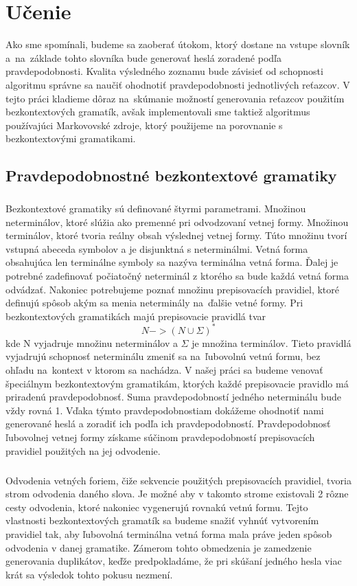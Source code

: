 \chapter{Učenie}
Ako sme spomínali, budeme sa zaoberať útokom, ktorý dostane na vstupe slovník a~na~základe tohto slovníka bude generovať heslá zoradené podľa pravdepodobnosti. Kvalita výsledného zoznamu bude závisieť od schopnosti algoritmu správne sa naučiť ohodnotiť pravdepodobnosti jednotlivých reťazcov. V tejto práci kladieme dôraz na~skúmanie možností generovania reťazcov použitím bezkontextových gramatík, avšak implementovali sme taktiež algoritmus používajúci Markovovské zdroje, ktorý použijeme na porovnanie s bezkontextovými gramatikami.

\section{Pravdepodobnostné bezkontextové gramatiky}
\paragraph{}
Bezkontextové gramatiky sú definované štyrmi parametrami. Množinou neterminálov, ktoré slúžia ako premenné pri odvodzovaní vetnej formy. Množinou terminálov, ktoré tvoria reálny obsah výslednej vetnej formy. Túto množinu tvorí vstupná abeceda symbolov a je disjunktná s neterminálmi. Vetná forma obsahujúca len terminálne symboly sa nazýva terminálna vetná forma. Ďalej je potrebné zadefinovať počiatočný neterminál z ktorého sa bude každá vetná forma odvádzať. Nakoniec potrebujeme poznať množinu prepisovacích pravidiel, ktoré definujú spôsob akým sa menia neterminály na~ďalšie vetné formy. Pri bezkontextových gramatikách majú prepisovacie pravidlá tvar
\[N -> (N \cup \Sigma)^*\]
kde N vyjadruje množinu neterminálov a \(\Sigma\) je množina terminálov. Tieto pravidlá vyjadrujú schopnosť neterminálu zmeniť sa na~ľubovolnú vetnú formu, bez ohľadu na~kontext v ktorom sa nachádza. V našej práci sa budeme venovať špeciálnym bezkontextovým gramatikám, ktorých každé prepisovacie pravidlo má priradenú pravdepodobnosť. Suma pravdepodobností jedného neterminálu bude vždy rovná 1. Vďaka týmto pravdepodobnostiam dokážeme ohodnotiť nami generované heslá a zoradiť ich podľa ich pravdepodobností. Pravdepodobnosť ľubovolnej vetnej formy získame súčinom pravdepodobností prepisovacích pravidiel použitých na jej odvodenie.

\paragraph{}
Odvodenia vetných foriem, čiže sekvencie použitých prepisovacích pravidiel, tvoria strom odvodenia daného slova. Je možné aby v takomto strome existovali 2 rôzne cesty odvodenia, ktoré nakoniec vygenerujú rovnakú vetnú formu. Tejto vlastnosti bezkontextových gramatík sa budeme snažiť vyhnúť vytvorením pravidiel tak, aby ľubovolná terminálna vetná forma mala práve jeden spôsob odvodenia v danej gramatike. Zámerom tohto obmedzenia je zamedzenie generovania duplikátov, keďže predpokladáme, že pri skúšaní jedného hesla viac krát sa výsledok tohto pokusu nezmení.

